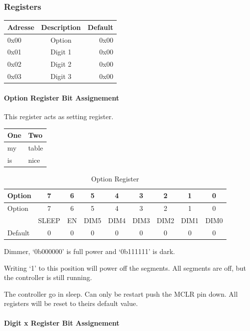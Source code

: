 \subsubsection{Registers}\label{registers}

\begin{longtable}[c]{@{}lcr@{}}
\toprule
Adresse & Description & Default\tabularnewline
\midrule
\endhead
0x00 & Option & 0x00\tabularnewline
0x01 & Digit 1 & 0x00\tabularnewline
0x02 & Digit 2 & 0x00\tabularnewline
0x03 & Digit 3 & 0x00\tabularnewline
\bottomrule
\end{longtable}

\paragraph{Option Register Bit
Assignement}\label{option-register-bit-assignement}

This register acts as setting register.

\begin{longtable}[c]{@{}ll@{}}
\toprule
One & Two\tabularnewline
\midrule
\endhead
my & table\tabularnewline
is & nice\tabularnewline
\bottomrule
\end{longtable}

\begin{longtable}[c]{@{}lcccccccc@{}}
\caption{Option Register}\tabularnewline
\toprule
Option & 7 & 6 & 5 & 4 & 3 & 2 & 1 & 0\tabularnewline
\midrule
\endfirsthead
\toprule
Option & 7 & 6 & 5 & 4 & 3 & 2 & 1 & 0\tabularnewline
\midrule
\endhead
& SLEEP & EN & DIM5 & DIM4 & DIM3 & DIM2 & DIM1 & DIM0\tabularnewline
Default & 0 & 0 & 0 & 0 & 0 & 0 & 0 & 0\tabularnewline
\bottomrule
\end{longtable}

\begin{description}
\tightlist
\item[DIM\textless{}5-0\textgreater{}]
Dimmer, `0b000000' is full power and `0b111111' is dark.
\item[EN]
Writing `1' to this position will power off the segments. All segments
are off, but the controller is still running.
\item[SLEEP]
The controller go in sleep. Can only be restart push the MCLR pin down.
All registers will be reset to theirs default value.
\end{description}

\paragraph{Digit x Register Bit
Assignement}\label{digit-x-register-bit-assignement}

